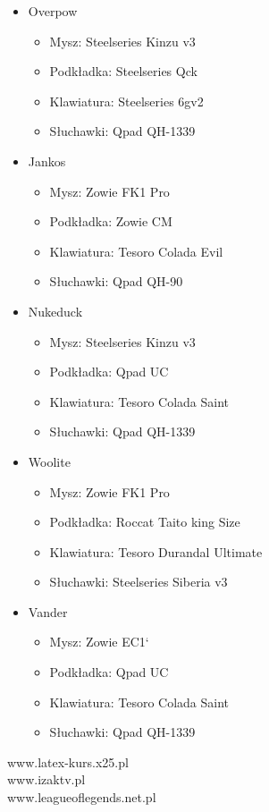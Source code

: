 \documentclass{article}
\begin{document}
\begin{itemize}
  \item Overpow
  \begin{itemize}
    \item Mysz: Steelseries Kinzu v3
    \item Podkładka: Steelseries Qck
    \item Klawiatura: Steelseries 6gv2
    \item Słuchawki: Qpad QH-1339
  \end{itemize}
  \item Jankos
  \begin{itemize}
    \item Mysz: Zowie FK1 Pro
    \item Podkładka: Zowie CM
    \item Klawiatura: Tesoro Colada Evil
    \item Słuchawki: Qpad QH-90
  \end{itemize}
  \item Nukeduck
  \begin{itemize}
    \item Mysz: Steelseries Kinzu v3
    \item Podkładka: Qpad UC
    \item Klawiatura: Tesoro Colada Saint
    \item Słuchawki: Qpad QH-1339
  \end{itemize}
  \item Woolite
  \begin{itemize}
    \item Mysz: Zowie FK1 Pro
    \item Podkładka: Roccat Taito king Size
    \item Klawiatura: Tesoro Durandal Ultimate
    \item Słuchawki: Steelseries Siberia v3
  \end{itemize}
  \item Vander
  \begin{itemize}
    \item Mysz: Zowie EC1`
    \item Podkładka: Qpad UC
    \item Klawiatura: Tesoro Colada Saint
    \item Słuchawki: Qpad QH-1339
  \end{itemize}
\end{itemize}
\begin{thebibliography}{99}
 www.latex-kurs.x25.pl\\
 www.izaktv.pl\\
 www.leagueoflegends.net.pl
\end{thebibliography}
\end{document}
